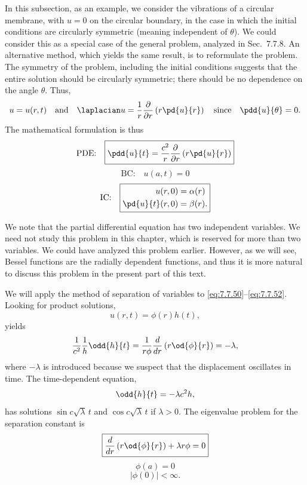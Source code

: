 In this subsection, as an example, we consider the vibrations of a circular membrane, with $u = 0$ on the circular boundary, in the case in which the initial conditions are circularly symmetric (meaning independent of $\theta$).  We could consider this as a special case of the general problem, analyzed in Sec.~7.7.8.  An alternative method, which yields the same result, is to reformulate the problem.  The symmetry of the problem, including the initial conditions suggests that the entire solution should be circularly symmetric; there should be no dependence on the angle $\theta$.  Thus,
\[
u = u(r,t) \quad\text{and}\quad \laplacian u = \frac{1}{r}\frac{\partial}{\partial r}\left(r\pd{u}{r}\right) \quad\text{since}\quad \pdd{u}{\theta} = 0.
\]
The mathematical formulation is thus
\begin{equation}
\text{PDE:}\quad
\boxed{\pdd{u}{t} = \frac{c^2}{r}\frac{\partial}{\partial r}\left(r\pd{u}{r}\right)}
\label{eq:7.7.50}
\end{equation}
\begin{equation}
\text{BC:}\quad
\boxed{u(a,t) = 0}
\label{eq:7.7.51}
\end{equation}
\begin{equation}
\text{IC:}\quad
\boxed{\begin{aligned}
u(r,0) &= \alpha(r) \\
\pd{u}{t}(r,0) &= \beta(r).
\end{aligned}}
\label{eq:7.7.52}
\end{equation}

We note that the partial differential equation has two independent variables.  We need not study this problem in this chapter, which is reserved for more than two variables.  We could have analyzed this problem earlier.  However, as we will see, Bessel functions are the radially dependent functions, and thus it is more natural to discuss this problem in the present part of this text.

We will apply the method of separation of variables to \eqref{eq:7.7.50}--\eqref{eq:7.7.52}.  Looking for product solutions,
\begin{equation}
u(r,t) = \phi(r)h(t),
\label{eq:7.7.53}
\end{equation}
yields
\begin{equation}
\frac{1}{c^2}\frac{1}{h}\odd{h}{t} = \frac{1}{r\phi}\frac{d}{d r}\left(r\od{\phi}{r}\right) = -\lambda,
\label{eq:7.7.54}
\end{equation}
where $-\lambda$ is introduced because we suspect that the displacement oscillates in time.  The time-dependent equation,
\[
\odd{h}{t} = -\lambda c^2 h,
\]
has solutions $\sin c\sqrt{\lambda}\,t$ and $\cos c\sqrt{\lambda}\,t$ if $\lambda > 0$.  The eigenvalue problem for the separation constant is
\begin{equation}
\boxed{\frac{d}{d r}\left(r\od{\phi}{r}\right) + \lambda r\phi = 0}
\label{eq:7.7.55}
\end{equation}
\begin{equation}
\boxed{\phi(a) = 0}
\label{eq:7.7.56}
\end{equation}
\begin{equation}
\boxed{|\phi(0)| < \infty.}
\label{eq:7.7.57}
\end{equation}

